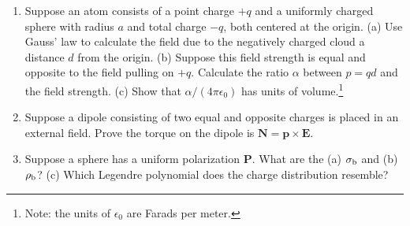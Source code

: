 \documentclass[10pt]{article}
\begin{document}
\begin{enumerate}
\item Suppose an atom consists of a point charge $+q$ and a uniformly charged sphere with radius $a$ and total charge $-q$, both centered at the origin. (a) Use Gauss' law to calculate the field due to the negatively charged cloud a distance $d$ from the origin. (b) Suppose this field strength is equal and opposite to the field pulling on $+q$.  Calculate the ratio $\alpha$ between $p = qd$ and the field strength. (c) Show that $\alpha/(4\pi\epsilon_0)$ has units of volume.\footnote{Note: the units of $\epsilon_0$ are Farads per meter.}\\ \vspace{2.5cm}
\item Suppose a dipole consisting of two equal and opposite charges is placed in an external field.  Prove the torque on the dipole is $\mathbf{N} = \mathbf{p} \times \mathbf{E}$. \\ \vspace{2cm}
\item Suppose a sphere has a uniform polarization $\mathbf{P}$.  What are the (a) $\sigma_{\rm b}$ and (b) $\rho_{\rm b}$? (c) Which Legendre polynomial does the charge distribution resemble?
\end{enumerate}
\end{document}
